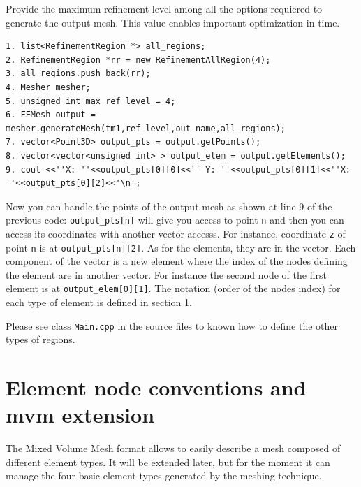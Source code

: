 \documentclass[10pt]{article}
\begin{document}
Provide the maximum refinement level among all the options requiered to generate the output mesh. This value enables important optimization in time.

{\small
\begin{verbatim}
1. list<RefinementRegion *> all_regions;
2. RefinementRegion *rr = new RefinementAllRegion(4);
3. all_regions.push_back(rr);
4. Mesher mesher;   
5. unsigned int max_ref_level = 4;
6. FEMesh output = mesher.generateMesh(tm1,ref_level,out_name,all_regions);
7. vector<Point3D> output_pts = output.getPoints();
8. vector<vector<unsigned int> > output_elem = output.getElements();
9. cout <<''X: ''<<output_pts[0][0]<<'' Y: ''<<output_pts[0][1]<<''X: ''<<output_pts[0][2]<<'\n'; 
\end{verbatim}
}

Now you can handle the points of the output mesh as shown at line 9 of the previous code: \texttt{output\_pts[n]} will give you access to point \texttt{n} and then you can access its coordinates with another vector accesss. For instance, coordinate \texttt{z} of point \texttt{n} is at \texttt{output\_pts[n][2]}. As for the elements, they are in the vector. Each component of  the vector is a new element where the index of the nodes defining the element are in another vector. For instance the second node of the first element is at \texttt{output\_elem[0][1]}. The notation (order of the nodes index) for each type of element is defined in section \ref{conventions}.

Please see class \texttt{Main.cpp} in the source files to known how to define the other types of regions.

\section{Element node conventions and mvm extension}
\label{conventions}

The Mixed Volume Mesh format allows to easily describe a mesh composed of different element types. It will be extended later, but for the moment it can manage the four basic element types generated by the meshing technique. 
\end{document}

